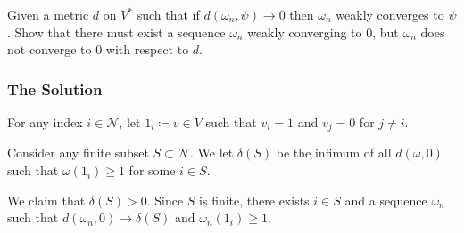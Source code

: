 Given a metric \(d\) on \(V^*\) such that if \(d(\omega_n, \psi) \to 0\) then \(\omega_n\) weakly converges
to \(\psi\). Show that there must exist a sequence \(\omega_n\) weakly converging to \(0\), but \(\omega_n\)
does not converge to \(0\) with respect to \(d\). 

\subsubsection*{The Solution}

For any index \(i \in \mathcal N\), let \(1_i \coloneq v \in V\) such that \(v_i = 1\) and \(v_j = 0\) for
\(j \neq i\).

Consider any finite subset \(S \subset \mathcal N\). We let \(\delta(S)\) be the infimum of all
\(d(\omega, 0)\) such that \(\omega(1_i) \geq 1\) for some \(i \in S\).

We claim that \(\delta(S) > 0\). Since \(S\) is finite, there exists \(i \in S\) and a sequence \(\omega_n\)
such that \(d(\omega_n, 0) \to \delta(S)\) and \(\omega_n(1_i) \geq 1\). 


